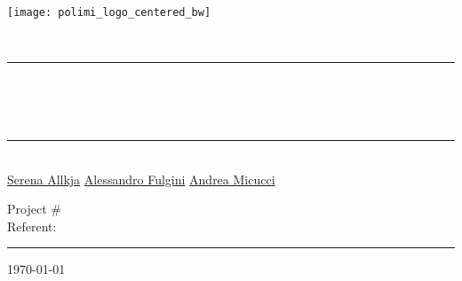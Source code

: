 \sffamily
\centering
\makeatletter

\Large\texttt{[image: polimi\_logo\_centered\_bw]}

\vspace{70pt} %

{\Large{}\selectfont \@subject \\}
\rule{\linewidth}{3pt}\\
\sffamily
{\fontsize{36pt}{48pt}\selectfont \@title \\}
\vspace{12pt}
{\fontsize{20pt}{24pt}\selectfont \@subtitle \\}

\vspace{8pt} %

\rule{\linewidth}{3pt}\\[0.5\baselineskip]

{\Large{}\selectfont
\href{mailto:serena.allkja@mail.polimi.it}{\color{black} Serena Allkja} \qquad
\href{mailto:alessandro.fulgini@mail.polimi.it}{\color{black} Alessandro Fulgini} \qquad
\href{mailto:andrea.micucci@mail.polimi.it}{\color{black} Andrea Micucci} \\
}

\vfill %

{
  \sffamily
  \large{}\selectfont

  Project \#\@projectno \\[0.5\baselineskip]
  Referent: \@referent \\
  
  \rule{32ex}{1pt}
  
  \today
}

\makeatother